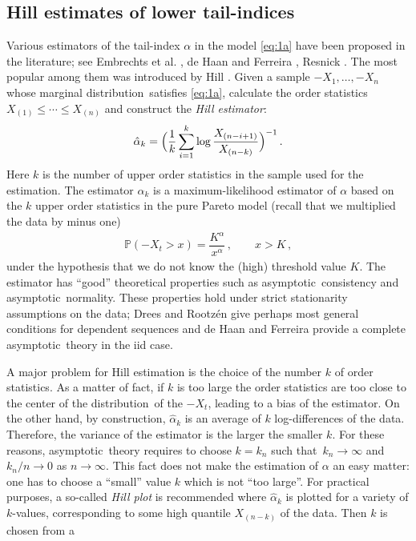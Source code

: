 \documentclass[11pt,a4]{amsart}
\newcommand{\asy}{asymptotic}
\newcommand{\beao}{\begin{eqnarray*}}
\newcommand{\eeao}{\end{eqnarray*}\noindent}
\newcommand{\beam}{\begin{eqnarray}}
\newcommand{\eeam}{\end{eqnarray}\noindent}
\newcommand{\nto}{n\to\infty}
\newcommand{\st}{such that}
\newcommand{\ds}{distribution}
\newcommand{\seq}{sequence}
\renewcommand{\P }{{\mathbb P}}
\newcommand{\1}{{\mathbf 1}}
\begin{document}
\subsection{Hill estimates of lower tail-indices}\label{sec:Hill}
Various estimators of the tail-index $\alpha$  in the model
\eqref{eq:1a} have been proposed in the literature;
see Embrechts et al. \cite{embrechts:klueppelberg:mikosch:1997}, de
Haan and Ferreira \cite{haan:ferreira:2006}, Resnick
\cite{resnick:2007}. The most popular among them was introduced  by
Hill \cite{hill1975simple}.
Given a sample $-X_1,\ldots,-X_n$ whose marginal \ds\ satisfies  \eqref{eq:1a}, calculate
the order statistics $X_{(1)}\le \cdots\le X_{(n)}$  and construct the
{\em Hill estimator}:
\beao%
  \hat \alpha_k = \Big(
    {1 \over k} \sum_{i=1}^k \log {X_{(n-i+1)} \over X_{(n-k)}}
    \Big)^{-1}\,.
\eeao
Here $k$  is the number of upper order statistics in the sample used
for the estimation. The estimator $\hat \alpha_k$ is 
a maximum-likelihood estimator of $\alpha$ based on the $k$ upper
order statistics in the pure Pareto model (recall that 
we multiplied the data by minus one)
\beam\label{eq:3}
\P(-X_t>x)= \dfrac{K^\alpha}{x^\alpha}\,,\qquad x>K\,,
\eeam
under the hypothesis that we do not know the (high) threshold value
$K$. The estimator has ``good'' theoretical properties such as 
\asy\ consistency and \asy\ normality. These properties hold under
strict stationarity assumptions on the data; Drees and Rootz\'en 
\cite{drees:rootzen:2010} give perhaps most general conditions for
dependent \seq s and de Haan and Ferreira \cite{haan:ferreira:2006} provide
a complete \asy\ theory in the iid case.
\par
A major problem for Hill estimation is the choice of the number $k$ of
order statistics. As  a matter of fact,
if $k$ is too large the order statistics are too close to the center
of the \ds\ of the $-X_t$, leading to a bias
of the estimator. On the other hand, by construction, $\hat \alpha_k$ is an average of $k$ log-differences of the 
data. Therefore, the variance of the estimator is the larger the
smaller $k$. For these reasons, \asy\ theory requires 
to choose $k=k_n$ \st\ $k_n\to\infty$ and $k_n/n\to 0$ as $\nto$. This
fact does not make the estimation of $\alpha$ an  
easy matter: one has to choose a ``small'' value $k$ which is not
``too large''. For practical purposes,
a so-called {\em Hill plot} is recommended where $\hat \alpha_k$ is
plotted for a variety of $k$-values, corresponding to
some high  quantile $X_{(n-k)}$ of the data. Then $k$ is chosen from a
\end{document}
